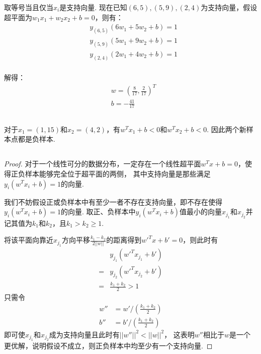 \documentclass[12pt, a4paper]{article}
\begin{document}
取等号当且仅当$x_i$是支持向量. 现在已知$(6,5),(5,9),(2,4)$为支持向量，假设超平面为$w_1x_1+w_2x_2+b=0$，则有：
\begin{align*}
    &y_{(6,5)}(6w_1+5w_2+b)=1\\
    &y_{(5,9)}(5w_1+9w_2+b)=1\\
    &y_{(2,4)}(2w_1+4w_2+b)=1\\
\end{align*}

解得：
\begin{align*}
    &w=(\frac{8}{17},\frac{2}{17})^T\\
    &b=-\frac{41}{17}
\end{align*}

\subsection{}

对于$x_1=(1,15)$和$x_2=(4,2)$，有$w^Tx_1+b<0$和$w^Tx_2+b<0$. 因此两个新样本点都是负样本. 

\subsection{}

\newtheorem*{proof}{Proof}

\begin{proof}
    对于一个线性可分的数据分布，一定存在一个线性超平面$w^Tx+b=0$，使得正负样本能够完全位于超平面的两侧，
    其中支持向量是那些满足$y_i(w^Tx_i+b)=1$的向量.
    
    我们不妨假设正或负样本中有至少一者不存在支持向量，即不存在使得$y_i(w^Tx_i+b)=1$的向量.
    取正、负样本中$y_i(w^Tx_i+b)$值最小的向量$x_{j_1}$和$x_{j_2}$并记其值为$k_1$和$k_2$，且$k_1>k_2\geq 1$. 

    将该平面向靠近$x_{j_1}$方向平移$\frac{k_1-k_2}{2||w||}$的距离得到${w'}^Tx+b'=0$，则此时有
    \begin{align*}
        &y_{j_1}({w'}^Tx_{j_1}+b')\\
        =&y_{j_2}({w'}^Tx_{j_2}+b')\\
        =&\frac{k_1+k_2}{2}>1
    \end{align*}
    只需令
    \begin{align*}
        w''&=w'/(\frac{k_1+k_2}{2})\\
        b''&=b'/(\frac{k_1+k_2}{2})
    \end{align*}
    即可使$x_{j_1}$和$x_{j_2}$成为支持向量且此时有$||w''||^2<||w||^2$，
    这表明$w''$相比于$w$是一个更优解，说明假设不成立，则正负样本中均至少有一个支持向量. 
\end{proof}
\end{document}
